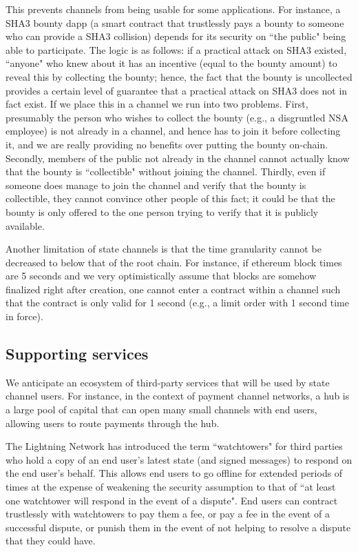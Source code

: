 \documentclass[prb,floatfix,reprint,nofootinbib,amsmath,amssymb,epsfig,pre,floats,letterpaper,groupedaffiliation,tightenlines,allcolors=blue,11pt]{revtex4}
\theoremstyle{definition}
\theoremstyle{definition}
\theoremstyle{definition}
\begin{document}
This prevents channels from being usable for some applications. For instance, a SHA3 bounty dapp (a smart contract that trustlessly pays a bounty to someone who can provide a SHA3 collision) depends for its security on ``the public" being able to participate. The logic is as follows: if a practical attack on SHA3 existed, ``anyone" who knew about it has an incentive (equal to the bounty amount) to reveal this by collecting the bounty; hence, the fact that the bounty is uncollected provides a certain level of guarantee that a practical attack on SHA3 does not in fact exist. If we place this in a channel we run into two problems. First, presumably the person who wishes to collect the bounty (e.g., a disgruntled NSA employee) is not already in a channel, and hence has to join it before collecting it, and we are really providing no benefits over putting the bounty on-chain. Secondly, members of the public not already in the channel cannot actually know that the bounty is ``collectible" without joining the channel. Thirdly, even if someone does manage to join the channel and verify that the bounty is collectible, they cannot convince other people of this fact; it could be that the bounty is only offered to the one person trying to verify that it is publicly available.

Another limitation of state channels is that the time granularity cannot be decreased to below that of the root chain. For instance, if ethereum block times are 5 seconds and we very optimistically assume that blocks are somehow finalized right after creation, one cannot enter a contract within a channel such that the contract is only valid for 1 second (e.g., a limit order with 1 second time in force).

\subsection{Supporting services}
\label{sec:supporting}

We anticipate an ecosystem of third-party services that will be used by state channel users. For instance, in the context of payment channel networks, a hub is a large pool of capital that can open many small channels with end users, allowing users to route payments through the hub.

The Lightning Network has introduced the term ``watchtowers" for third parties who hold a copy of an end user's latest state (and signed messages) to respond on the end user's behalf. This allows end users to go offline for extended periods of times at the expense of weakening the security assumption to that of ``at least one watchtower will respond in the event of a dispute". End users can contract trustlessly with watchtowers to pay them a fee, or pay a fee in the event of a successful dispute, or punish them in the event of not helping to resolve a dispute that they could have.
\end{document}
